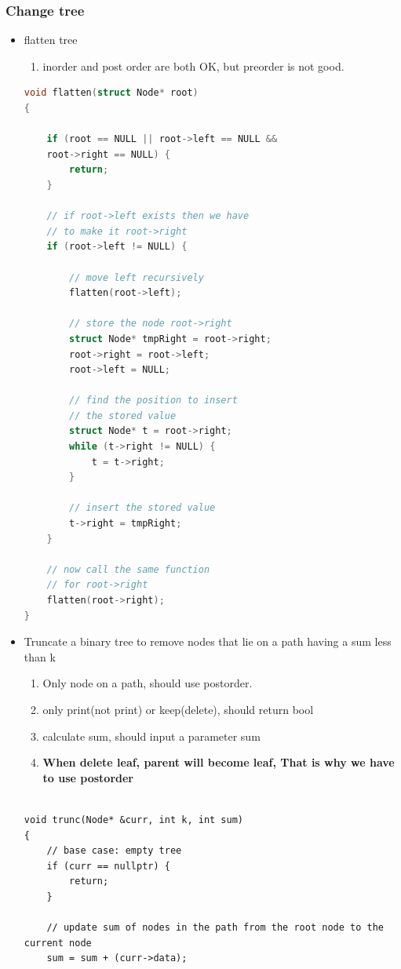 \documentclass[a4paper,11pt,twoside]{book}
\begin{document}
\subsubsection{Change tree}
\begin{itemize}
	\item flatten tree
\begin{enumerate}
	\item inorder and post order are both OK, but preorder is not good.
\end{enumerate}
\begin{lstlisting}[frame=single, language=c++]	
void flatten(struct Node* root)
{
	
	if (root == NULL || root->left == NULL &&
	root->right == NULL) {
		return;
	}
	
	// if root->left exists then we have
	// to make it root->right
	if (root->left != NULL) {
		
		// move left recursively
		flatten(root->left);
		
		// store the node root->right
		struct Node* tmpRight = root->right;
		root->right = root->left;
		root->left = NULL;
		
		// find the position to insert
		// the stored value  
		struct Node* t = root->right;
		while (t->right != NULL) {
			t = t->right;
		}
		
		// insert the stored value
		t->right = tmpRight;
	}
	
	// now call the same function
	// for root->right
	flatten(root->right);
}
\end{lstlisting}

\item Truncate a binary tree to remove nodes that lie on a path having a sum less than k
\begin{enumerate}
	\item Only node on a path, should use postorder. 
	\item only print(not print) or keep(delete), should return bool
	\item calculate sum, should input a parameter sum
	\item \textbf{When delete leaf, parent will become leaf, That is why we have to use postorder}
\end{enumerate}
\begin{lstlisting}
	
void trunc(Node* &curr, int k, int sum)
{
	// base case: empty tree
	if (curr == nullptr) {
		return;
	}
	
	// update sum of nodes in the path from the root node to the current node
	sum = sum + (curr->data);
	

\end{lstlisting}
\end{itemize}
\end{document}
